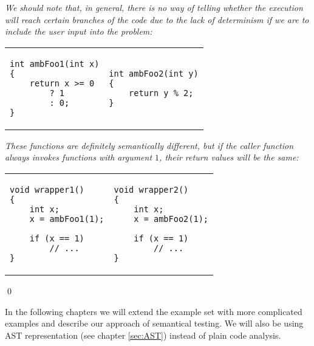 \begin{exmp}
\textit{We should note that, in general, there is no way of telling whether the execution will reach certain branches of the code due to the lack of determinism if we are to include the user input into the problem:}

\begin{tabular}{ p{4.5cm} p{4.5cm} }
\begin{lstlisting}
int ambFoo1(int x)
{
    return x >= 0
        ? 1
        : 0;
}
\end{lstlisting}
&
\begin{lstlisting}
int ambFoo2(int y)
{
    return y % 2;
}
\end{lstlisting}
\end{tabular}

\textit{These functions are definitely semantically different, but if the caller function always invokes functions with argument $1$, their return values will be the same:}

\begin{tabular}{ p{4.5cm} p{4.5cm} }
\begin{lstlisting}
void wrapper1()
{
    int x;
    x = ambFoo1(1);

    if (x == 1)
        // ...
}
\end{lstlisting}
&
\begin{lstlisting}
void wrapper2()
{
    int x;
    x = ambFoo2(1);

    if (x == 1)
        // ...
}
\end{lstlisting}
\end{tabular}

\qed
\end{exmp}

In the following chapters we will extend the example set with more complicated examples and describe our approach of semantical testing. We will also be using AST representation (see chapter \ref{sec:AST}) instead of plain code analysis.
